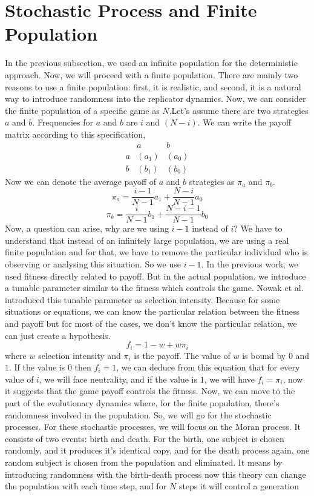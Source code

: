 \documentclass{article}
\begin{document}
\section{Stochastic Process and Finite Population}
In the previous subsection, we used an infinite population for the deterministic approach. Now, we will proceed with a finite population. There are mainly two reasons to use a finite population: first, it is realistic, and second, it is a natural way to introduce randomness into the replicator dynamics.
Now, we can consider the finite population of a specific game as $N$.Let's assume there are two strategies $a$ and $b$. Frequencies for $a$ and $b$ are $i$ and $(N-i)$. We can write the payoff matrix according to this specification,
\[
\begin{array}{c|cc}
    & a & b \\
    \hline
  a & (a_1) & (a_0) \\
  b & (b_1) & (b_0)
\end{array}
\]
Now we can denote the average payoff of $a$ and $b$ strategies as $\pi_a$ and $\pi_b$.
\[\pi_a=\frac{i-1}{N-1}a_1 + \frac{N-i}{N-1}a_0\]
\[\pi_b=\frac {i}{N-1}b_1 + \frac{N-i-1}{N-1}b_0\]
Now, a question can arise, why are we using $i-1$ instead of $i$? We have to understand that instead of an infinitely large population, we are using a real finite population and for that, we have to remove the particular individual who is observing or analysing this situation. So we use $i-1$.
In the previous work, we used fitness directly related to payoff. But in the actual population, we introduce a tunable parameter similar to the fitness which controls the game.
Nowak et al.\cite{Nowak2004} introduced this tunable parameter as selection intensity. Because for some situations or equations, we can know the particular relation between the fitness and payoff but for most of the cases, we don't know the particular relation, we can just create a hypothesis.
\[f_i=1-w+w\pi_i\]
where $w$ selection intensity and $\pi_i$ is the payoff. The value of $w$ is bound by  $0$ and $1$. If the value is $0$ then $f_i=1$, we can deduce from this equation that for every value of $i$, we will face neutrality, and if the value is $1$, we will have $f_i=\pi_i$, now it suggests that the game payoff controls the fitness.
Now, we can move to the part of the evolutionary dynamics where, for the finite population, there's randomness involved in the population. So, we will go for the stochastic processes.
For these stochastic processes, we will focus on the Moran process. It consists of two events: birth and death. For the birth, one subject is chosen randomly, and it produces it's identical copy, and for the death process again, one random subject is chosen from the population and eliminated. It means by introducing randomness with the birth-death process now this theory can change the population with each time step, and for $N$ steps it will control a generation \cite{Moran1962}
\end{document}
